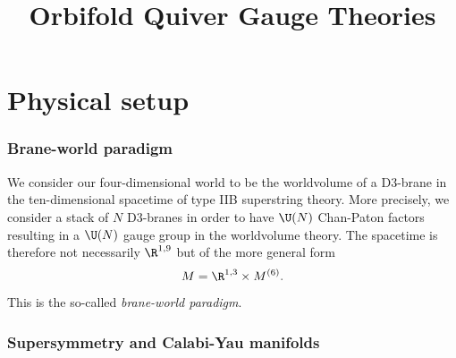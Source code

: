\documentclass{worksheetclass}
\title{Orbifold Quiver Gauge Theories}
\begin{document}
\maketitle

\tableofcontents

\section{Physical setup}

    \subsubsection*{Brane-world paradigm}

        We consider our four-dimensional world to be the worldvolume of a D$3$-brane in the ten-dimensional spacetime of type IIB superstring theory. More precisely, we consider a stack of $N$ D$3$-branes in order to have $\U(N)$ Chan-Paton factors resulting in a $\U(N)$ gauge group in the worldvolume theory. The spacetime is therefore not necessarily $\R^{1,9}$ but of the more general form
        \begin{equation*}
            M = \R^{1,3}\times M^{(6)}.\label{spacetimedecomp}
        \end{equation*}
        This is the so-called \emph{brane-world paradigm}. %

    \subsubsection*{Supersymmetry and Calabi-Yau manifolds}
    
\end{document}
